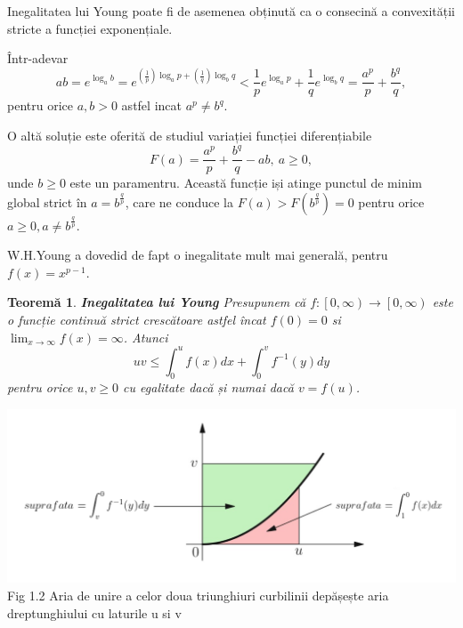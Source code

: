 \documentclass[a4paper,12pt,oneside]{report}
\newtheorem{theorem}{Teorem\u a}
\begin{document}
Inegalitatea lui Young poate fi de asemenea obținută ca o consecină a convexității stricte a funcției exponențiale.

Într-adevar
\begin{displaymath}
  ab = e^{\log_{a}b}= e^{\left (\frac{1}{p}  \right )\log_{a}p+ \left ( \frac{1}{q} \right )\log_{b}q}
< \frac{1}{p}e^{\log_{a}p}+\frac{1}{q}e^{\log_{b}q}= \frac{a^{p}}{p}+\frac{b^{q}}{q},
\end{displaymath}
pentru orice \(a,b>0\) astfel incat \(a^{p}\neq b^{q}\).

O altă soluție este oferită de studiul variației funcției diferențiabile
\begin{displaymath}
  F\left ( a \right )= \frac{a^{p}}{p}+\frac{b^{q}}{q} - ab,~ a\geq 0,
\end{displaymath}
unde \(b\geq 0\) este un paramentru. Această funcție iși atinge punctul de minim global strict în \(a= b^{\frac{q}{p}}\), care ne conduce la \(F\left ( a \right )> F\left ( b^{\frac{q}{p}} \right ) = 0\) pentru orice \(a\geq 0, a\neq b^{\frac{q}{p}}\).

	W.H.Young a dovedid de fapt  o inegalitate mult mai generală, pentru \(f\left ( x \right )=  x^{p-1}\).

\begin{theorem}
\textbf{Inegalitatea lui Young
}
Presupunem că \(f: \left [ 0,\infty  \right ) \rightarrow \left [ 0,\infty  \right )\) este o funcție continuă strict crescătoare astfel încat \(f\left ( 0 \right )= 0\) si \(\lim_{x\rightarrow \infty }f\left ( x \right )= \infty\). Atunci
\begin{displaymath}
  uv\leq \int_{0}^{u}f\left ( x \right )dx + \int_{0}^{v}f^{-1}\left ( y \right )dy
\end{displaymath}
pentru orice \(u,v\geq 0\) cu egalitate dacă și numai dacă \( v = f\left ( u \right )\).
\end{theorem}
\begin{center}
	\includegraphics[width=1.0\textwidth]{fig1.2.png}
	\\ Fig 1.2 Aria  de unire a celor doua triunghiuri curbilinii depășește aria dreptunghiului cu laturile u si v
\end{center}
\end{document}
